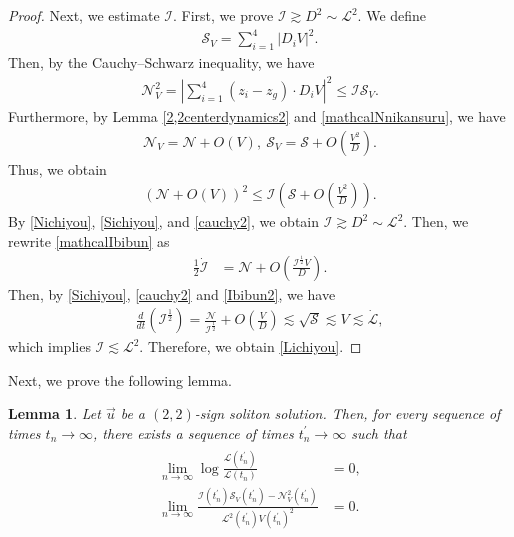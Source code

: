\documentclass[10pt,a4paper]{amsart}
\newtheorem{lemma}[theorem]{Lemma}
\numberwithin{equation}{section}
\begin{document}
\begin{proof}
Next, we estimate $\mathcal{I}$. First, we prove $\mathcal{I}\gtrsim D^2\sim \mathcal{L}^2$. We define
\begin{align*}
\mathcal{S}_V=\sum_{i=1}^4\left|D_iV\right|^2.
\end{align*}
Then, by the Cauchy--Schwarz inequality, we have
\begin{align}\label{cauchy1}
\mathcal{N}_V^2=\left|\sum_{i=1}^4\left(z_i-z_g\right)\cdot D_iV\right|^2\leq \mathcal{I}\mathcal{S}_V.
\end{align}
Furthermore, by Lemma \ref{2,2centerdynamics2} and \eqref{mathcalNnikansuru}, we have
\begin{align}\label{NVtoSVes}
\mathcal{N}_V=\mathcal{N}+O\left(V\right),\ \mathcal{S}_V=\mathcal{S}+O\left(\frac{V^2}{D}\right).
\end{align}
Thus, we obtain 
\begin{align}\label{cauchy2}
\left(\mathcal{N}+O(V)\right)^2\leq \mathcal{I}\left(\mathcal{S}+O\left(\frac{V^2}{D}\right)\right).
\end{align}
By \eqref{Nichiyou}, \eqref{Sichiyou}, and \eqref{cauchy2}, we obtain $\mathcal{I}\gtrsim D^2\sim \mathcal{L}^2$. Then, we rewrite \eqref{mathcalIbibun} as 
\begin{align}\label{Ibibun2}
\frac{1}{2}\dot{\mathcal{I}}&=\mathcal{N}+O\left(\frac{\mathcal{I}^{\frac{1}{2}}V}{D}\right).
\end{align}
Then, by \eqref{Sichiyou}, \eqref{cauchy2} and \eqref{Ibibun2}, we have
\begin{align*}
\frac{d}{dt}\left(\mathcal{I}^{\frac{1}{2}}\right)=\frac{\mathcal{N}}{\mathcal{I}^{\frac{1}{2}}}+O\left(\frac{V}{D}\right)\lesssim \sqrt{\mathcal{S}}\lesssim V\lesssim \dot{\mathcal{L}},
\end{align*}
which implies $\mathcal{I}\lesssim \mathcal{L}^2$. Therefore, we obtain \eqref{Lichiyou}.
\end{proof}

Next, we prove the following lemma.
\begin{lemma}\label{tenretulemma1}
Let $\vec{u}$ be a $(2,2)$-sign soliton solution. Then, for every sequence of times $t_n\to\infty$, there exists a sequence of times $t_n^{\prime}\to\infty$ such that
\begin{align}
\begin{aligned}\label{hodai0802}
\lim_{n\to\infty}
\log{\frac{\mathcal{L}(t_n^{\prime})}{\mathcal{L}(t_n)}}
&=0,
\\
\lim_{n\to\infty}
\frac{
\mathcal{I}(t_n^{\prime})\mathcal{S}_V(t_n^{\prime})
-\mathcal{N}_V^2(t_n^{\prime})
}{
\mathcal{L}^2(t_n^{\prime})V(t_n^{\prime})^2
}
&=0.
\end{aligned}
\end{align}
\end{lemma}
\end{document}
